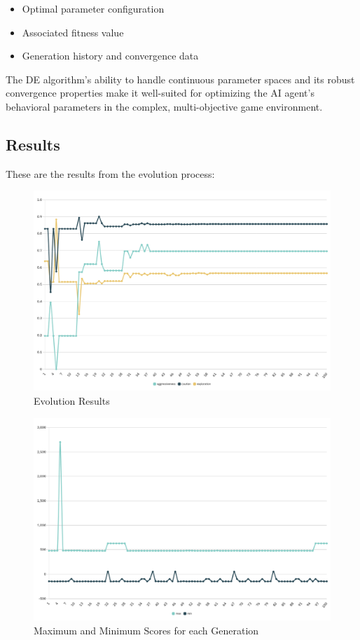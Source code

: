 \documentclass[sigconf]{acmart} %
\begin{document}
\begin{itemize}
    \item Optimal parameter configuration
    \item Associated fitness value
    \item Generation history and convergence data
\end{itemize}

The DE algorithm's ability to handle continuous parameter spaces and its robust convergence properties make it well-suited for optimizing the AI agent's behavioral parameters in the complex, multi-objective game environment.

\subsection{Results}

These are the results from the evolution process:

\begin{figure}[H]
    \centering
    \includegraphics[width=0.9\linewidth]{pictures/Graph_5_75.png}
    \caption{\label{fig:Graph_575} Evolution Results}
    
\end{figure}

\begin{figure}[H]
    \centering
    \includegraphics[width=0.9\linewidth]{pictures/Graph_min_max.png}
    \caption{\label{fig:Graph_min_max}Maximum and Minimum Scores for each Generation}
\end{figure}
\end{document}
